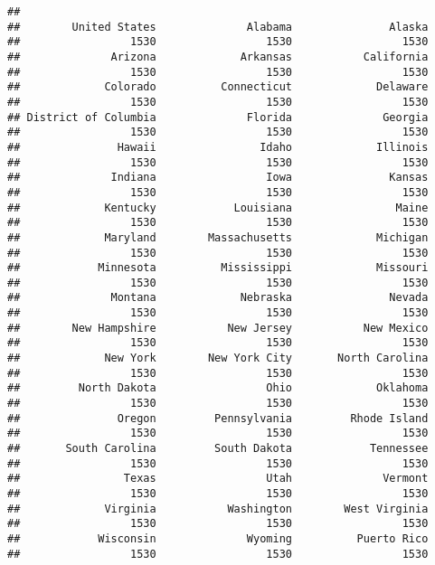 \documentclass[
]{article}
\begin{document}
\begin{verbatim}
## 
##        United States              Alabama               Alaska 
##                 1530                 1530                 1530 
##              Arizona             Arkansas           California 
##                 1530                 1530                 1530 
##             Colorado          Connecticut             Delaware 
##                 1530                 1530                 1530 
## District of Columbia              Florida              Georgia 
##                 1530                 1530                 1530 
##               Hawaii                Idaho             Illinois 
##                 1530                 1530                 1530 
##              Indiana                 Iowa               Kansas 
##                 1530                 1530                 1530 
##             Kentucky            Louisiana                Maine 
##                 1530                 1530                 1530 
##             Maryland        Massachusetts             Michigan 
##                 1530                 1530                 1530 
##            Minnesota          Mississippi             Missouri 
##                 1530                 1530                 1530 
##              Montana             Nebraska               Nevada 
##                 1530                 1530                 1530 
##        New Hampshire           New Jersey           New Mexico 
##                 1530                 1530                 1530 
##             New York        New York City       North Carolina 
##                 1530                 1530                 1530 
##         North Dakota                 Ohio             Oklahoma 
##                 1530                 1530                 1530 
##               Oregon         Pennsylvania         Rhode Island 
##                 1530                 1530                 1530 
##       South Carolina         South Dakota            Tennessee 
##                 1530                 1530                 1530 
##                Texas                 Utah              Vermont 
##                 1530                 1530                 1530 
##             Virginia           Washington        West Virginia 
##                 1530                 1530                 1530 
##            Wisconsin              Wyoming          Puerto Rico 
##                 1530                 1530                 1530
\end{verbatim}
\end{document}

